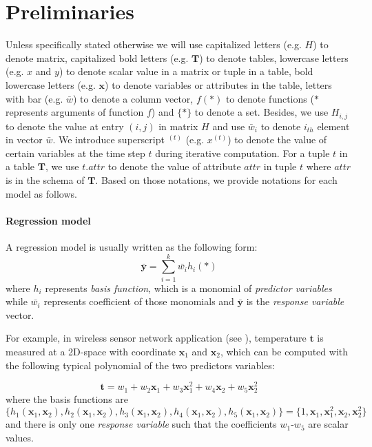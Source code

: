 \section{Preliminaries}\label{sec: pre}
Unless specifically stated otherwise we will use capitalized letters (e.g. $H$) to denote matrix, capitalized bold letters (e.g. $\textbf{T}$) to denote tables, lowercase letters (e.g. $x$ and $y$) to denote scalar value in a matrix or tuple in a table, bold lowercase letters (e.g. $\textbf{x}$) to denote variables or attributes in the table, letters with bar (e.g. $\bar{w}$) to denote a column vector, $f(*)$ to denote functions ($*$ represents arguments of function $f$) and $\{*\}$ to denote a set. Besides, we use $H_{i,j}$ to denote the value at entry $(i,j)$ in matrix $H$ and use $\bar{w}_i$ to denote $i_{th}$ element in vector $\bar{w}$. We introduce superscript $^{(t)}$ (e.g. $x^{(t)}$) to denote the value of certain variables at the time step $t$ during iterative computation. For a tuple $t$ in a table $\textbf{T}$, we use $t.attr$ to denote the value of attribute $attr$ in tuple $t$ where $attr$ is in the schema of $\textbf{T}$. Based on those notations, we provide notations for each model as follows.

\paragraph{Regression model}
A regression model is usually written as the following form:
\begin{equation}
\bar{\textbf{y}}=\sum_{i=1}^k\bar{w_i}h_i(*)
\end{equation}
where $h_i$ represents {\em basis function}, which is a monomial of {\em predictor variables} while $\bar{w_i}$ represents coefficient of those monomials and $\bar{\textbf{y}}$ is the {\em response variable} vector.

For example, in wireless sensor network application (see \cite{deshpande2006mauvedb}), temperature $\textbf{t}$ is measured at a 2D-space with coordinate $\textbf{x}_1$ and $\textbf{x}_2$, which can be computed with the following typical polynomial of the two predictors variables:

\begin{equation}
\textbf{t}=w_1 + w_2\textbf{x}_1+w_3\textbf{x}_1^2 + w_4\textbf{x}_2+w_5\textbf{x}_2^2
\end{equation}
where the basis functions are $\{h_1(\textbf{x}_1,\textbf{x}_2), h_2(\textbf{x}_1,\textbf{x}_2), h_3(\textbf{x}_1,\textbf{x}_2),h_4(\textbf{x}_1,\textbf{x}_2), h_5(\textbf{x}_1,\textbf{x}_2)\}=\{1, \textbf{x}_1, \textbf{x}_1^2, \textbf{x}_2, \textbf{x}_2^2\}$ and there is only one {\em response variable} such that the coefficients $w_1$-$w_5$ are scalar values.

